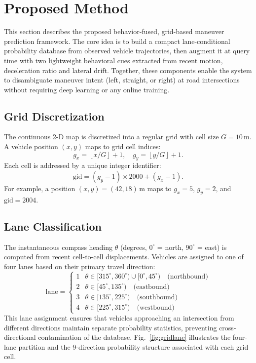\documentclass[conference]{IEEEtran}
\begin{document}
\section{Proposed Method}\label{sec:method}

This section describes the proposed behavior-fused, grid-based maneuver prediction framework.
The core idea is to build a compact lane-conditional probability database from observed vehicle trajectories, then augment it at query time with two lightweight behavioral cues extracted from recent motion, deceleration ratio and lateral drift.
Together, these components enable the system to disambiguate maneuver intent (left, straight, or right) at road intersections without requiring deep learning or any online training.

\subsection{Grid Discretization}
The continuous 2-D map is discretized into a regular grid with cell size $G = 10$\,m.
A vehicle position $(x, y)$ maps to grid cell indices:
\begin{equation}
  g_x = \left\lfloor x/G \right\rfloor + 1, \quad g_y = \left\lfloor y/G \right\rfloor + 1.
\end{equation}
Each cell is addressed by a unique integer identifier:
\begin{equation}
  \mathrm{gid} = (g_y - 1) \times 2000 + (g_x - 1).
\end{equation}
For example, a position $(x, y) = (42, 18)$\,m maps to $g_x = 5$, $g_y = 2$, and $\mathrm{gid} = 2004$.

\subsection{Lane Classification}
The instantaneous compass heading $\theta$ (degrees, $0^\circ$ = north, $90^\circ$ = east) is computed from recent cell-to-cell displacements.
Vehicles are assigned to one of four lanes based on their primary travel direction:
\begin{equation}
  \mathrm{lane} =
  \begin{cases}
    1 & \theta \in [315^\circ, 360^\circ) \cup [0^\circ, 45^\circ) \quad\text{(northbound)} \\
    2 & \theta \in [45^\circ, 135^\circ) \quad\text{(eastbound)} \\
    3 & \theta \in [135^\circ, 225^\circ) \quad\text{(southbound)} \\
    4 & \theta \in [225^\circ, 315^\circ) \quad\text{(westbound)}
  \end{cases}
\end{equation}
This lane assignment ensures that vehicles approaching an intersection from different directions maintain separate probability statistics, preventing cross-directional contamination of the database.
Fig.~\ref{fig:gridlane} illustrates the four-lane partition and the 9-direction probability structure associated with each grid cell.
\end{document}
